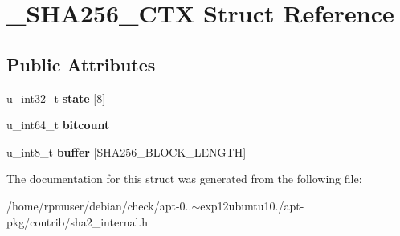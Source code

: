 \section{\-\_\-\-S\-H\-A256\-\_\-\-C\-T\-X \-Struct \-Reference}
\label{struct__SHA256__CTX}
\subsection*{\-Public \-Attributes}
\begin{DoxyCompactItemize}
\item 
u\-\_\-int32\-\_\-t {\bfseries state} [8]\label{struct__SHA256__CTX_afc95900bca1aa474d77aceec4237696c}

\item 
u\-\_\-int64\-\_\-t {\bfseries bitcount}\label{struct__SHA256__CTX_a3593cb15126345d9b952e58ecfa73101}

\item 
u\-\_\-int8\-\_\-t {\bfseries buffer} [\-S\-H\-A256\-\_\-\-B\-L\-O\-C\-K\-\_\-\-L\-E\-N\-G\-T\-H]\label{struct__SHA256__CTX_aae0e4e98cdae7ee89dd98e381db30f80}

\end{DoxyCompactItemize}


\-The documentation for this struct was generated from the following file\-:\begin{DoxyCompactItemize}
\item 
/home/rpmuser/debian/check/apt-\/0..$\sim$exp12ubuntu10./apt-\/pkg/contrib/sha2\-\_\-internal.\-h\end{DoxyCompactItemize}
